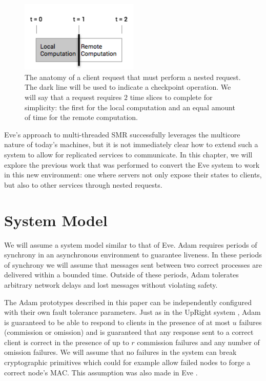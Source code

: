 \documentclass[11pt, oneside]{report}
\begin{document}
\begin{figure}[h]
\centering
\includegraphics[width=0.5\textwidth]{RequestAnatomy.png}
\caption{\label{anatomy}The anatomy of a client request that must perform a nested request. The dark line will be used to indicate a checkpoint operation. We will say that a request requires $2$ time slices to complete for simplicity: the first for the local computation and an equal amount of time for the remote computation.}
\end{figure}

Eve's approach to multi-threaded SMR successfully leverages the multicore nature of today's machines, but it is not immediately clear how to extend such a system to allow for replicated services to communicate. 
In this chapter, we will explore the previous work that was performed to convert the Eve system to work in this new environment: one where servers not only expose their states to clients, but also to other services through nested requests.

\section{System Model}
We will assume a system model similar to that of Eve. 
Adam requires periods of synchrony in an asynchronous environment to guarantee liveness. 
In these periods of synchrony we will assume that messages sent between two correct processes are delivered within a bounded time. 
Outside of these periods, Adam tolerates arbitrary network delays and lost messages without violating safety.

The Adam prototypes described in this paper can be independently configured with their own fault tolerance parameters. 
Just as in the UpRight system \cite{upRight}, Adam is guaranteed to be able to respond to clients in the presence of at most $u$ failures (commission or omission) and is guaranteed that any response sent to a correct client is correct in the presence of up to $r$ commission failures and any number of omission failures. 
We will assume that no failures in the system can break cryptographic primitives which could for example allow failed nodes to forge a correct node's MAC. This assumption was also made in Eve \cite{manosThesis, eve}.
\end{document}
